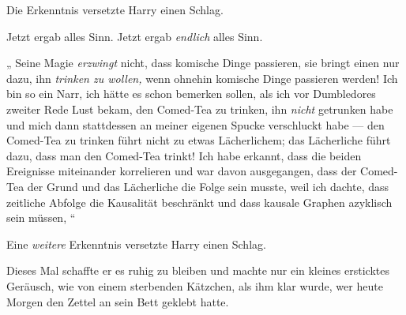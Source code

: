 Die Erkenntnis versetzte Harry einen Schlag.

Jetzt ergab alles Sinn. Jetzt ergab \emph{endlich} alles Sinn.

„ Seine Magie \emph{erzwingt} nicht, dass komische Dinge passieren, sie bringt einen nur dazu, ihn \emph{trinken zu wollen,} wenn ohnehin komische Dinge passieren werden! Ich bin so ein Narr, ich hätte es schon bemerken sollen, als ich vor Dumbledores zweiter Rede Lust bekam, den Comed-Tea zu trinken, ihn \emph{nicht} getrunken habe und mich dann stattdessen an meiner eigenen Spucke verschluckt habe — den Comed-Tea zu trinken führt nicht zu etwas Lächerlichem; das Lächerliche führt dazu, dass man den Comed-Tea trinkt! Ich habe erkannt, dass die beiden Ereignisse miteinander korrelieren und war davon ausgegangen, dass der Comed-Tea der Grund und das Lächerliche die Folge sein musste, weil ich dachte, dass zeitliche Abfolge die Kausalität beschränkt und dass kausale Graphen azyklisch sein müssen, “

Eine \emph{weitere} Erkenntnis versetzte Harry einen Schlag.

Dieses Mal schaffte er es ruhig zu bleiben und machte nur ein kleines ersticktes Geräusch, wie von einem sterbenden Kätzchen, als ihm klar wurde, wer heute Morgen den Zettel an sein Bett geklebt hatte.

